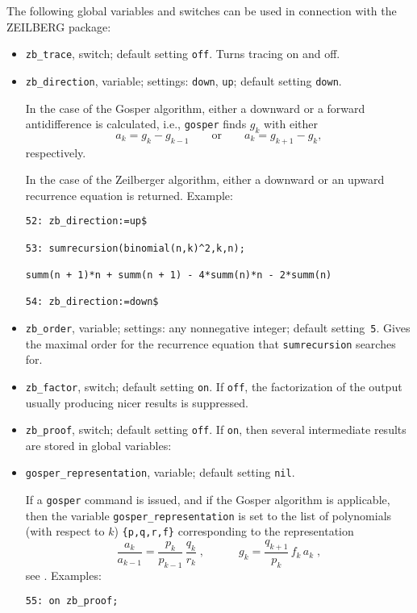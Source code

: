 The following global variables and switches can be used in connection with
the \textsc{ZEILBERG} package:
\begin{itemize}
\item
\texttt{zb\_trace}, switch; default setting \texttt{off}.
Turns tracing on and off.
\item
\texttt{zb\_direction}, variable; settings: \texttt{down}, \texttt{up};
default setting \texttt{down}.

In the case of the Gosper algorithm, either a downward or a forward
antidifference is calculated, i.e., \texttt{gosper} finds $g_k$ with either
\[
a_k=g_k-g_{k-1}
\quad\quad\mbox{or}\quad\quad
a_k=g_{k+1}-g_{k},
\]
respectively.

In the case of the Zeilberger algorithm, either a downward or an upward
recurrence equation is returned. Example:

{\small
\begin{verbatim}
52: zb_direction:=up$

53: sumrecursion(binomial(n,k)^2,k,n);

summ(n + 1)*n + summ(n + 1) - 4*summ(n)*n - 2*summ(n)

54: zb_direction:=down$
\end{verbatim}
}\noindent
\item
\texttt{zb\_order}, variable; settings: any nonnegative integer;
default setting~\texttt{5}.
Gives the maximal order for the recurrence
equation that \texttt{sumrecursion} searches for.
\item
\texttt{zb\_factor}, switch; default setting \texttt{on}.
If \texttt{off}, the factorization of the output usually producing nicer results
is suppressed.
\item
\texttt{zb\_proof}, switch; default setting \texttt{off}. If \texttt{on},
then several intermediate results are stored in global variables:
\item
\texttt{gosper\_representation}, variable; default setting \texttt{nil}.

If a \texttt{gosper} command is issued, and if the Gosper algorithm is applicable,
then the variable \texttt{gosper\_representation} is set to the
list of polynomials (with respect to $k$) \texttt{\{p,q,r,f\}}
corresponding to the representation
\[
\frac{a_k}{a_{k-1}}=\frac{p_k}{p_{k-1}}\,\frac{q_k}{r_k}
\;,
\quad\quad\quad
g_k=\frac{q_{k+1}}{p_k}\,f_k\,a_k
\;,
\]
see \cite{Gosper:78}. Examples:

{\small
\begin{verbatim}
55: on zb_proof;


\end{verbatim}}
\end{itemize}
